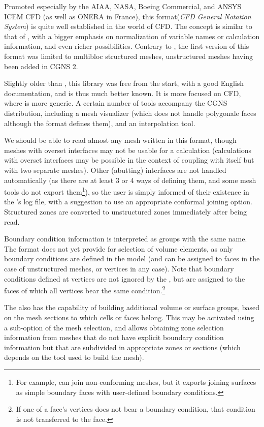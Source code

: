 {{{
\label{fmtdesc:cgns}

Promoted especially by the AIAA, NASA, Boeing Commercial, and ANSYS ICEM CFD (as well as ONERA in France),
this format(\emph{CFD General Notation System}) is quite well established in
the world of CFD. The concept is similar to that of \med, with a bigger
emphasis on normalization of variable names or calculation information, and
even richer possibilities. Contrary to \med, the first version of this format
was limited to multibloc structured meshes, unstructured meshes having been
added in CGNS 2.

Slightly older than \med, this library was free from the start, with a good
English documentation, and is thus much better known. It is more focused
on CFD, where \med is more generic. A certain number of tools accompany
the CGNS distribution, including a mesh visualizer (which does not handle
polygonale faces although the format defines them), and an interpolation
tool.

We should be able to read almost any mesh written in this format, though
meshes with overset interfaces may not be usable for a calculation 
(calculations with overset interfaces may be possible in the context of coupling \CS 
with itself but with two separate meshes).
Other (abutting) interfaces are not handled automatically (as there are
at least 3 or 4 ways of defining them, and some mesh tools do not export
them\footnote{For example, \icemcfd can join non-conforming meshes, but it
exports joining surfaces as simple boundary faces with user-defined boundary
conditions.}), so the user is simply informed of their existence in the
\pcs's log file, with a suggestion to use an appropriate conformal joining
option. Structured zones are converted to unstructured zones immediately after
being read.

Boundary condition information is interpreted as groups with the same
name. The format does not yet provide for selection of volume elements,
as only boundary conditions are defined in the model (and can be assigned to
faces in the case of unstructured meshes, or vertices in any case).
Note that boundary conditions defined at vertices are not ignored by
the \pcs, but are assigned to the faces of which all vertices bear
the same condition.\footnote{If one of a face's vertices does not bear
a boundary condition, that condition is not transferred to the face.}

The \pcs also has the capability of building additional volume or surface groups,
based on the mesh sections to which cells or faces belong. This may be
activated using a sub-option of the mesh selection, and allows obtaining
zone selection information from meshes that do not have explicit
boundary condition information but that are subdivided in appropriate zones or
sections (which depends on the tool used to build the mesh).

}}}
